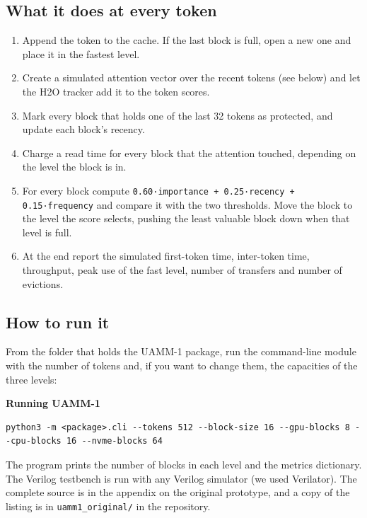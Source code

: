 \documentclass[12pt,a4paper]{report}
\begin{document}
\subsection{What it does at every token}
\begin{enumerate}
\item Append the token to the cache. If the last block is full, open a new one and place it in the fastest level.
\item Create a simulated attention vector over the recent tokens (see below) and let the H2O tracker add it to the token scores.
\item Mark every block that holds one of the last 32 tokens as protected, and update each block's recency.
\item Charge a read time for every block that the attention touched, depending on the level the block is in.
\item For every block compute \texttt{0.\allowbreak{}60·importance + 0.\allowbreak{}25·recency + 0.\allowbreak{}15·frequency} and compare it with the two thresholds. Move the block to the level the score selects, pushing the least valuable block down when that level is full.
\item At the end report the simulated first-token time, inter-token time, throughput, peak use of the fast level, number of transfers and number of evictions.
\end{enumerate}
\subsection{How to run it}
From the folder that holds the UAMM-1 package, run the command-line module with the number of tokens and, if you want to change them, the capacities of the three levels:

\par\smallskip\noindent\textbf{Running UAMM-1}\par\nopagebreak
\begin{lstlisting}
python3 -m <package>.cli --tokens 512 --block-size 16 --gpu-blocks 8 --cpu-blocks 16 --nvme-blocks 64
\end{lstlisting}
The program prints the number of blocks in each level and the metrics dictionary. The Verilog testbench is run with any Verilog simulator (we used Verilator). The complete source is in the appendix on the original prototype, and a copy of the listing is in \texttt{uamm1\_\allowbreak{}\allowbreak{}original/\allowbreak{}} in the repository.
\end{document}
